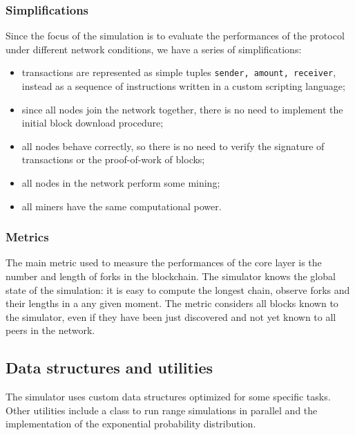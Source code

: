 \subsubsection{Simplifications}
Since the focus of the simulation is to evaluate the performances of the protocol under different network conditions, we have a series of simplifications:
\begin{itemize}
	\item transactions are represented as simple tuples \texttt{\textlangle sender, amount, receiver\textrangle}, instead as a sequence of instructions written in a custom scripting language;
	\item since all nodes join the network together, there is no need to implement the initial block download procedure;
	\item all nodes behave correctly, so there is no need to verify the signature of transactions or the proof-of-work of blocks;
	\item all nodes in the network perform some mining;
	\item all miners have the same computational power.
\end{itemize}

\subsubsection{Metrics}
The main metric used to measure the performances of the core layer is the number and length of forks in the blockchain.
The simulator knows the global state of the simulation:
it is easy to compute the longest chain, observe forks and their lengths in a any given moment.
The metric considers all blocks known to the simulator, even if they have been just discovered and not yet known to all peers in the network.

\subsection{Data structures and utilities}
The simulator uses custom data structures optimized for some specific tasks.
Other utilities include a class to run range simulations in parallel and the implementation of the exponential probability distribution.

